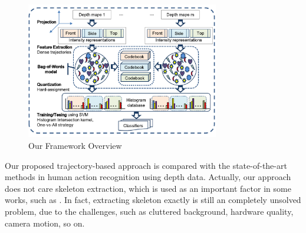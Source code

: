 \documentclass[final,3p,times,twocolumn]{elsarticle}
\begin{document}
\begin{figure}[t]
	\centering
		\includegraphics[width=0.75\textwidth]{Framework3D.pdf} %
	\caption{\label{lbl:Figure_Framework}Our Framework Overview}
\end{figure}


Our proposed trajectory-based approach is compared with the state-of-the-art methods in human action recognition using depth data. Actually, our approach does not care skeleton extraction, which is used as an important factor in some works, such as \cite{wang2012mining, yang2012eigenjoints}. In fact, extracting skeleton exactly is still an completely unsolved problem, due to the challenges, such as cluttered background, hardware quality, camera motion, so on.
\end{document}
